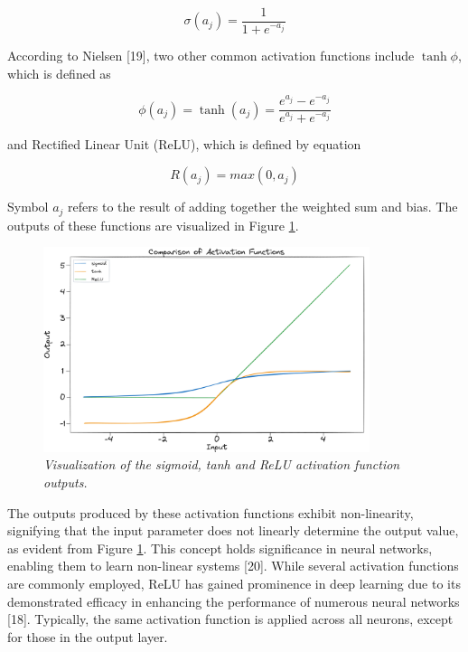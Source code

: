 \begin{equation}
    \sigma(a_j) = \frac{1}{1+e^{-a_j}}
\end{equation}

According to Nielsen [19], two other common activation functions include \(\tanh \phi\),
which is defined as

\begin{equation}
    \phi(a_j) = \tanh(a_j) = \frac{e^{a_j} - e^{-a_j}}{e^{a_j} + e^{-a_j}}
\end{equation}

and Rectified Linear Unit (ReLU), which is defined by equation

\begin{equation}
    R(a_j) = max(0, a_j)
\end{equation}

Symbol \(a_j\) refers to the result of adding together the weighted sum and bias. The
outputs of these functions are visualized in Figure \ref{fig:activation}.


\begin{figure}[H]
    \centering
    \includegraphics[width=\textwidth,height=6cm,keepaspectratio=true]{activation.png}
    \caption{
        \it{Visualization of the sigmoid, tanh and ReLU activation function outputs.}
    }
    \label{fig:activation}
\end{figure}

The outputs produced by these activation functions exhibit non-linearity, signifying that the input parameter does not linearly determine the output value, as evident from Figure \ref{fig:activation}. This concept holds significance in neural networks, enabling them to learn non-linear systems [20]. While several activation functions are commonly employed, ReLU has gained prominence in deep learning due to its demonstrated efficacy in enhancing the performance of numerous neural networks [18]. Typically, the same activation function is applied across all neurons, except for those in the output layer.

